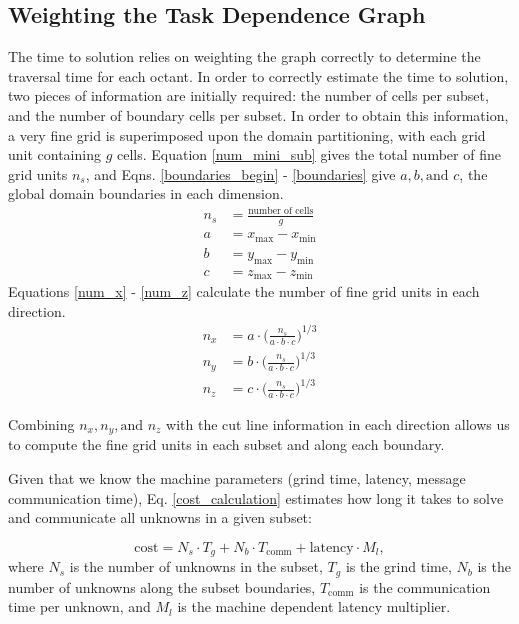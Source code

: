 \documentclass[11pt, letterpaper,titlepage,oneside]{article}
\begin{document}
\subsection{Weighting the Task Dependence Graph}\label{weighting_graphs}

The time to solution relies on weighting the graph correctly to determine the traversal time for each octant. In order to correctly estimate the time to solution, two pieces of information are initially required: the number of cells per subset, and the number of boundary cells per subset. In order to obtain this information, a very fine grid is superimposed upon the domain partitioning, with each grid unit containing $g$ cells. Equation \eqref{num_mini_sub} gives the total number of fine grid units $n_s$, and Eqns. \eqref{boundaries_begin} - \eqref{boundaries} give $a,b, \text{and }  c$, the global domain boundaries in each dimension. 
\begin{align}
\label{num_mini_sub}
n_s &= \frac{\text{number of cells}}{g} \\
\label{boundaries_begin}
a &= x_{\text{max}} - x_{\text{min}} \\
b &= y_{\text{max}} - y_{\text{min}} \\
c &= z_{\text{max}} - z_{\text{min}} 
\label{boundaries}
\end{align}
Equations \eqref{num_x} - \eqref{num_z} calculate the number of fine grid units in each direction.
\begin{align}
\label{num_x}
n_{x} &= a \cdot \Big(\frac{n_s}{a\cdot b \cdot c}\Big)^{1/3} \\
n_{y} &= b \cdot \Big(\frac{n_s}{a\cdot b \cdot c}\Big)^{1/3} \\
n_{z} &= c \cdot \Big(\frac{n_s}{a\cdot b \cdot c}\Big)^{1/3} 
\label{num_z}
\end{align}

Combining $n_x, n_y, \text{and } n_z$ with the cut line information in each direction allows us to compute the fine grid units in each subset and along each boundary.  

Given that we know the machine parameters (grind time, latency, message communication time), Eq. \ref{cost_calculation} estimates how long it takes to solve and communicate all unknowns in a given subset:

\begin{equation}
\text{cost} = N_s\cdot T_g + N_b\cdot T_{\text{comm}} + \text{latency}\cdot M_l,
\label{cost_calculation}
\end{equation}
where $N_s$ is the number of unknowns in the subset, $T_g$ is the grind time, $N_b$ is the number of unknowns along the subset boundaries, $T_\text{comm}$ is the communication time per unknown, and $M_l$ is the machine dependent latency multiplier. 
\end{document}
